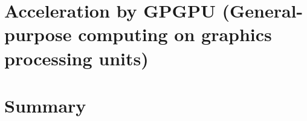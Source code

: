 \section[Acceleration by GPGPU]{Acceleration by GPGPU (General-purpose
computing on graphics processing units)}
%
%
\section{Summary}

